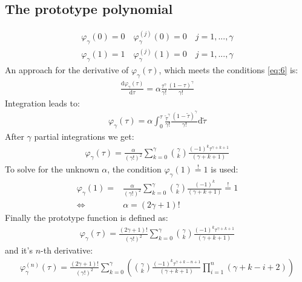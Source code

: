 \documentclass[a4paper,12pt,headinclude=true,headsepline,parskip=half,DIV=12]{scrartcl}
\renewcommand{\d}{\mathrm{d}} %
\begin{document}
\begin{appendices}



  \section{The prototype polynomial} \label{app:DerivePolyPrototype}

  \begin{subequations}
    \label{eq:6}
    \begin{align}
      \varphi_\gamma(0)=0 \quad \varphi^{(j)}_\gamma(0)=0 \quad j = 1,...,\gamma \\
      \varphi_\gamma(1)=1 \quad \varphi^{(j)}_\gamma(1)=0 \quad j = 1,...,\gamma
    \end{align}
  \end{subequations}
  An approach for the derivative of $\varphi_\gamma(\tau)$, which meets the conditions \autoref{eq:6} is:
  \begin{align}
    \frac{\d \varphi_\gamma(\tau)}{\d \tau} = \alpha \frac{\tau^{\gamma}}{\gamma!}\frac{(1-\tau)^{\gamma}}{\gamma!}
  \end{align}
  Integration leads to:
  \begin{align}
    \varphi_\gamma(\tau) = \alpha \int_0^\tau\frac{\tilde{\tau}^{\gamma}}{\gamma!}\frac{(1-\tilde{\tau})^{\gamma}}{\gamma!} \d \tilde{\tau}
  \end{align}
  After $\gamma$ partial integrations we get:
  \begin{align*}
    \varphi_\gamma(\tau)= \frac{\alpha}{(\gamma!)^2} \sum_{k=0}^{\gamma} \binom{\gamma}{k} \frac{(-1)^k\tau^{\gamma+k+1}}{(\gamma+k+1)}
  \end{align*}
  To solve for the unknown $\alpha$, the  condition $\varphi_\gamma(1)\overset{!}{=}1$ is used:
  \begin{align*}
    \varphi_\gamma(1)=    & \frac{\alpha}{(\gamma!)^2} \sum_{k=0}^{\gamma} \binom{\gamma}{k} \frac{(-1)^k}{(\gamma+k+1)} \overset{!}{=} 1 \\
    \Leftrightarrow \quad & \alpha = (2\gamma+1)!
  \end{align*}
  Finally the prototype function is defined as:
  \begin{align}
    \varphi_\gamma(\tau)= \frac{(2\gamma+1)!}{(\gamma!)^2} \sum_{k=0}^{\gamma} \binom{\gamma}{k} \frac{(-1)^k\tau^{\gamma+k+1}}{(\gamma+k+1)}
  \end{align}
  and it's $n$-th derivative:
  \begin{align}
    \varphi_\gamma^{(n)}(\tau)= \frac{(2\gamma+1)!}{(\gamma!)^2} \sum_{k=0}^{\gamma} \left(\binom{\gamma}{k} \frac{(-1)^k\tau^{\gamma+k-n+1}}{(\gamma+k+1)}\prod_{i=1}^n(\gamma+k-i+2)\right)

\end{align}
\end{appendices}
\end{document}
